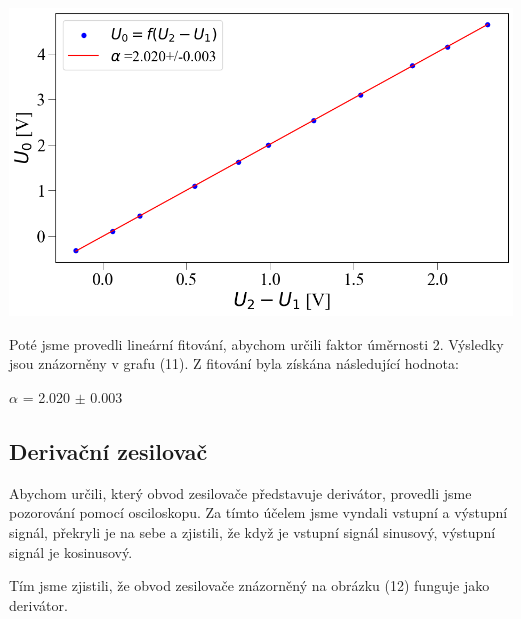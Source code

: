 \documentclass[a4paper,11pt]{article}
\begin{document}
    \begin{minipage}[t]{0.5\textwidth}
                \vspace{10pt}           
                \par \centering
                \includegraphics[scale=0.32]{diff}
                \captionsetup{justification=centering, font=footnotesize}
                \label{fig:diff}
                \vspace{10pt}
                \raggedright

                \par Poté jsme provedli lineární fitování, abychom určili faktor úměrnosti 2. Výsledky jsou znázorněny v grafu (11). Z fitování byla získána následující hodnota:
                \begin{center}
                    $\alpha$ = 2.020 $\pm$ 0.003
                \end{center}

            \subsection{Derivační zesilovač}
                Abychom určili, který obvod zesilovače představuje derivátor, provedli jsme pozorování pomocí osciloskopu. Za tímto účelem jsme vyndali vstupní a výstupní signál, překryli je na sebe a zjistili, že když je vstupní signál sinusový, výstupní signál je kosinusový.
                \par Tím jsme zjistili, že obvod zesilovače znázorněný na obrázku (12) funguje jako derivátor.


\end{minipage}
\end{document}
